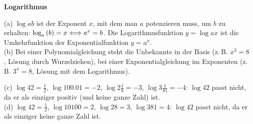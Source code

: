 \documentclass[11pt]{exam}
\newcommand{\theme}{Logarithmus}
\begin{document}
\fontsize{14}{14}\selectfont
\begin{center}
    \huge\bf\theme
\end{center}

\begin{questions}
\noaddpoints
\question[\totalpoints]
\addpoints
{}
{\begin{solution}
		(a) $\log{a}{b}$ ist der Exponent $x$, mit dem man $a$ potenzieren muss, um $b$ zu erhalten: $\log{a}{b}=x\same a^x=b$. Die Logarithmusfunktion $y=\log{a}{x}$ ist die Umkehrfunktion der Exponentialfunktion $y=a^x$.\\
		(b) Bei einer Polynomialgleichung steht die Unbekannte in der Basis (z.\,B. $x^3=8$, Lösung durch Wurzelziehen), bei einer Exponentialgleichung im Exponenten (z.\,B. $3^x=8$, Lösung mit dem Logarithmus).
\end{solution}}
{}
{\begin{solution}
		(c) $\log{4}{2}=\frac{1}{2}$, $\log{10}{0.01}=-2$, $\log{2}{\frac{1}{8}}=-3$, $\log{3}{\frac{1}{81}}=-4$: $\log{4}{2}$ passt nicht, da er als einziger positiv (und keine ganze Zahl) ist.\\
		(d) $\log{4}{2}=\frac{1}{2}$, $\log{10}{100}=2$, $\log{2}{8}=3$, $\log{3}{81}=4$: $\log{4}{2}$ passt nicht, da er als einziger keine ganze Zahl ist.
\end{solution}}
{}


\end{questions}
\end{document}
